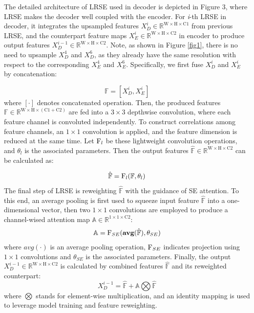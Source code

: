 \documentclass[review]{elsarticle}
\begin{document}
The detailed architecture of LRSE used in decoder is depicted in Figure 3, where LRSE makes the decoder well coupled with the encoder. For \emph{i}-th LRSE in decoder, it integrates the upsampled features $X_{D}^{i}\in \mathbb{R^{\mathrm{W\times H\times C1}}}$ from previous LRSE, and the counterpart feature maps $X_{E}^{i}\in \mathbb{R^{\mathrm{W\times H\times C2}}}$ in encoder to produce output features $X_{D}^{i-1}\in \mathbb{R^{\mathrm{W\times H\times C2}}}$. Note, as shown in Figure \ref{fig1}, there is no need to upsample $X_{D}^{4}$ and $X_{D}^{6}$, as they already have the same resolution with respect to the corresponding $X_{E}^{4}$ and $X_{E}^{6}$. Specifically, we first fuse $X_{D}^{i}$ and $X_{E}^{i}$ by concatenation:

\begin{equation}
	\mathbb{F}=[X_{D}^{i}, X_{E}^{i}]
\end{equation}
where $[\cdot]$ denotes concatenated operation. Then, the produced features $\mathbb{F}\in \mathbb{R^{\mathrm{W\times H\times (C1+C2)}}}$ are fed into a $3\times3$ depthwise convolution, where each feature channel is convoluted independently. To construct correlations among feature channels, an $1\times1$ convolution is applied, and the feature dimension is reduced at the same time. Let $\textup{F}_{l}$ be these lightweight convolution operations, and $\theta _{l}$ is the associated parameters. Then the output features $\hat{\mathbb{F}}\in \mathbb{R^{\mathrm{W\times H\times C2}}}$ can be calculated as:

\begin{equation}
	\hat{\mathbb{F}}=\textup{F}_{l}(\mathbb{F},\theta _{l})
\end{equation}
The final step of LRSE is reweighting $\hat{\mathbb{F}}$ with the guidance of SE\cite{2017Squeeze} attention. To this end, an average pooling is first used to squeeze input feature $\hat{\mathbb{F}}$ into a one-dimensional vector, then two $1\times1$ convolutions are employed to produce a channel-wised attention map $\mathbb{A}\in \mathbb{R^{\mathrm{1\times 1\times C2}}}$:
\begin{equation}
	\mathbb{A}=\textup{F}_{SE}(\textbf{avg}(\hat{\mathbb{F}}),\theta _{SE})
\end{equation}
where $avg(\cdot)$ is an average pooling operation, $\textup{F}_{SE}$ indicates projection using $1\times1$ convolutions and $\theta _{SE}$ is the associated parameters. Finally, the output $X_{D}^{i-1}\in \mathbb{R^{\mathrm{W\times H\times C2}}}$ is calculated by combined features $\hat{\mathbb{F}}$ and its reweighted counterpart:
\begin{equation}
	X_{D}^{i-1}=\hat{\mathbb{F}}+\mathbb{A}\bigotimes \hat{\mathbb{F}}
\end{equation}
where $\bigotimes$ stands for element-wise multiplication, and an identity mapping is used to leverage model training and feature reweighting. 
\end{document}
